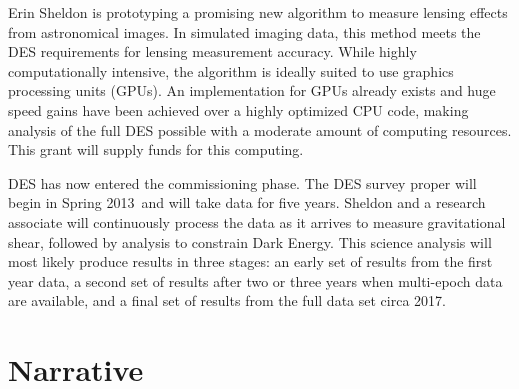 \documentclass[12pt]{article}
\newcommand{\surveyproper}{Spring 2013}
\begin{document}

Erin Sheldon is prototyping a promising new algorithm to measure lensing
effects from astronomical images.  In simulated imaging data, this method meets
the DES requirements for lensing measurement accuracy. While highly
computationally intensive, the algorithm is ideally suited to use graphics
processing units (GPUs). An implementation for GPUs already exists and huge
speed gains have been achieved over a highly optimized CPU code, making
analysis of the full DES possible with a moderate amount of computing
resources.   This grant will supply funds for this computing.

DES has now entered the commissioning phase.  The DES survey proper will begin
in \surveyproper\ and will take data for five years. Sheldon and a research
associate will continuously process the data as it arrives to measure
gravitational shear, followed by analysis to constrain Dark Energy.  This
science analysis will most likely produce results in three stages: an early set
of results from the first year data, a second set of results after two or three
years when multi-epoch data are available, and a final set of results from the
full data set circa 2017.


\newpage
{}
\section*{Narrative}
\setcounter{section}{1}
\end{document}
